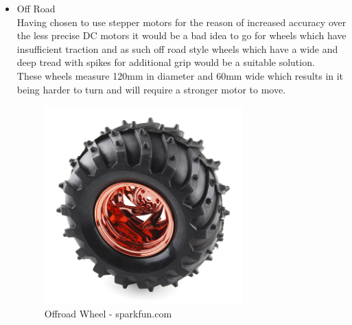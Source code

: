 \begin{itemize}
\item Off Road
\\Having chosen to use stepper motors for the reason of increased accuracy over the less precise DC motors it would be a bad idea to go for wheels which have insufficient traction and as such off road style wheels which have a wide and deep tread with spikes for additional grip would be a suitable solution.
\\These wheels measure 120mm in diameter and 60mm wide which results in it being harder to turn and will require a stronger motor to move.
\begin{figure}[H]
\centering
        \includegraphics[width=3.0in]  {Images/wheel-offroad.jpg}
        \caption{Offroad Wheel - sparkfun.com}
        \label{Offroad Wheel}
\end{figure}


\end{itemize}
